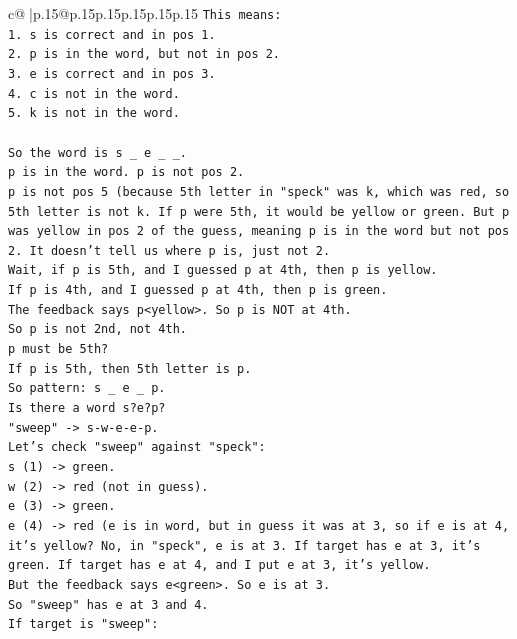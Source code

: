 \documentclass{article}
\begin{document}
{\begin{supertabular}{c@{$\;$}|p{.15\linewidth}@{}p{.15\linewidth}p{.15\linewidth}p{.15\linewidth}p{.15\linewidth}p{.15\linewidth}}
{{{\texttt{This means:} \\
\texttt{1. s is correct and in pos 1.} \\
\texttt{2. p is in the word, but not in pos 2.} \\
\texttt{3. e is correct and in pos 3.} \\
\texttt{4. c is not in the word.} \\
\texttt{5. k is not in the word.} \\
\\ 
\texttt{So the word is s \_ e \_ \_.} \\
\texttt{p is in the word. p is not pos 2.} \\
\texttt{p is not pos 5 (because 5th letter in "speck" was k, which was red, so 5th letter is not k. If p were 5th, it would be yellow or green. But p was yellow in pos 2 of the guess, meaning p is in the word but not pos 2. It doesn't tell us where p is, just not 2.} \\
\texttt{Wait, if p is 5th, and I guessed p at 4th, then p is yellow.} \\
\texttt{If p is 4th, and I guessed p at 4th, then p is green.} \\
\texttt{The feedback says p<yellow>. So p is NOT at 4th.} \\
\texttt{So p is not 2nd, not 4th.} \\
\texttt{p must be 5th?} \\
\texttt{If p is 5th, then 5th letter is p.} \\
\texttt{So pattern: s \_ e \_ p.} \\
\texttt{Is there a word s?e?p?} \\
\texttt{"sweep" {-}> s{-}w{-}e{-}e{-}p.} \\
\texttt{Let's check "sweep" against "speck":} \\
\texttt{s (1) {-}> green.} \\
\texttt{w (2) {-}> red (not in guess).} \\
\texttt{e (3) {-}> green.} \\
\texttt{e (4) {-}> red (e is in word, but in guess it was at 3, so if e is at 4, it's yellow? No, in "speck", e is at 3. If target has e at 3, it's green. If target has e at 4, and I put e at 3, it's yellow.} \\
\texttt{But the feedback says e<green>. So e is at 3.} \\
\texttt{So "sweep" has e at 3 and 4.} \\
\texttt{If target is "sweep":} \\
}}}
\end{supertabular}}
\end{document}
